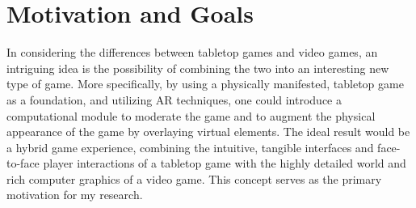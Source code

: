 \documentclass{thesis}
\begin{document}
\section{Motivation and Goals}

In considering the differences between tabletop games and video games, an intriguing idea is the possibility of combining the two into an interesting new type of game. 
More specifically, by using a physically manifested, tabletop game as a foundation, and utilizing AR techniques, one could introduce a computational module to moderate the game and to augment the physical appearance of the game by overlaying virtual elements. The ideal result would be a hybrid game experience, combining the intuitive, tangible interfaces and face-to-face player interactions of a tabletop game with the highly detailed world and rich computer graphics of a video game.
This concept serves as the primary motivation for my research.
\end{document}
